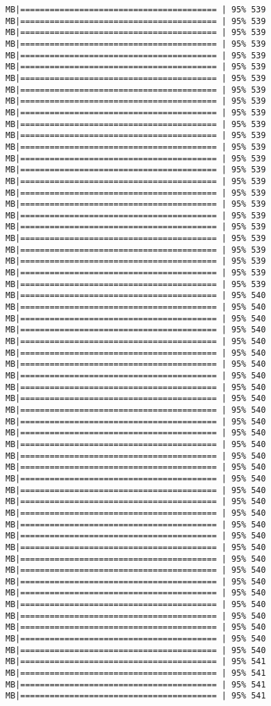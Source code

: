 \documentclass[
]{article}
\begin{document}
\begin{verbatim}
MB|======================================== | 95% 539 MB|======================================== | 95% 539 MB|======================================== | 95% 539 MB|======================================== | 95% 539 MB|======================================== | 95% 539 MB|======================================== | 95% 539 MB|======================================== | 95% 539 MB|======================================== | 95% 539 MB|======================================== | 95% 539 MB|======================================== | 95% 539 MB|======================================== | 95% 539 MB|======================================== | 95% 539 MB|======================================== | 95% 539 MB|======================================== | 95% 539 MB|======================================== | 95% 539 MB|======================================== | 95% 539 MB|======================================== | 95% 539 MB|======================================== | 95% 539 MB|======================================== | 95% 539 MB|======================================== | 95% 539 MB|======================================== | 95% 539 MB|======================================== | 95% 539 MB|======================================== | 95% 539 MB|======================================== | 95% 539 MB|======================================== | 95% 539 MB|======================================== | 95% 540 MB|======================================== | 95% 540 MB|======================================== | 95% 540 MB|======================================== | 95% 540 MB|======================================== | 95% 540 MB|======================================== | 95% 540 MB|======================================== | 95% 540 MB|======================================== | 95% 540 MB|======================================== | 95% 540 MB|======================================== | 95% 540 MB|======================================== | 95% 540 MB|======================================== | 95% 540 MB|======================================== | 95% 540 MB|======================================== | 95% 540 MB|======================================== | 95% 540 MB|======================================== | 95% 540 MB|======================================== | 95% 540 MB|======================================== | 95% 540 MB|======================================== | 95% 540 MB|======================================== | 95% 540 MB|======================================== | 95% 540 MB|======================================== | 95% 540 MB|======================================== | 95% 540 MB|======================================== | 95% 540 MB|======================================== | 95% 540 MB|======================================== | 95% 540 MB|======================================== | 95% 540 MB|======================================== | 95% 540 MB|======================================== | 95% 540 MB|======================================== | 95% 540 MB|======================================== | 95% 540 MB|======================================== | 95% 540 MB|======================================== | 95% 541 MB|======================================== | 95% 541 MB|======================================== | 95% 541 MB|======================================== | 95% 541 
\end{verbatim}
\end{document}
